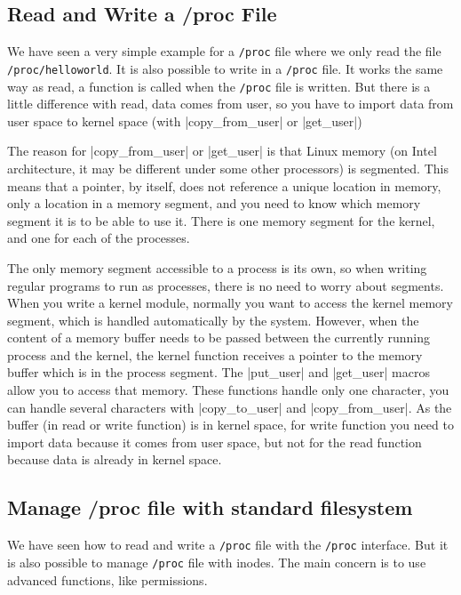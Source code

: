 \documentclass[10pt, oneside]{book}
\begin{document}
\subsection{Read and Write a /proc File}
\label{sec:read_write_procfs}
We have seen a very simple example for a \verb|/proc| file where we only read the file \verb|/proc/helloworld|.
It is also possible to write in a \verb|/proc| file.
It works the same way as read, a function is called when the \verb|/proc| file is written.
But there is a little difference with read, data comes from user, so you have to import data from user space to kernel space (with \cpp|copy_from_user| or \cpp|get_user|)

The reason for \cpp|copy_from_user| or \cpp|get_user| is that Linux memory (on Intel architecture, it may be different under some other processors) is segmented.
This means that a pointer, by itself, does not reference a unique location in memory, only a location in a memory segment, and you need to know which memory segment it is to be able to use it.
There is one memory segment for the kernel, and one for each of the processes.

The only memory segment accessible to a process is its own, so when writing regular programs to run as processes, there is no need to worry about segments.
When you write a kernel module, normally you want to access the kernel memory segment, which is handled automatically by the system.
However, when the content of a memory buffer needs to be passed between the currently running process and the kernel, the kernel function receives a pointer to the memory buffer which is in the process segment.
The \cpp|put_user| and \cpp|get_user| macros allow you to access that memory.
These functions handle only one character, you can handle several characters with \cpp|copy_to_user| and \cpp|copy_from_user|.
As the buffer (in read or write function) is in kernel space, for write function you need to import data because it comes from user space, but not for the read function because data is already in kernel space.


\subsection{Manage /proc file with standard filesystem}
\label{sec:manage_procfs}
We have seen how to read and write a \verb|/proc| file with the \verb|/proc| interface.
But it is also possible to manage \verb|/proc| file with inodes.
The main concern is to use advanced functions, like permissions.
\end{document}
